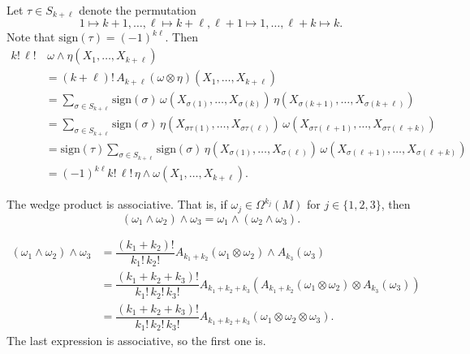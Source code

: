 \documentclass{ximera}
\begin{document}
    \begin{solution}
    Let $\tau \in S_{k + \ell }$ denote the permutation 
    \[   1 \mapsto  k  + 1 , \ldots , \ell \mapsto k + \ell , \ell + 1 \mapsto 1 , \ldots ,  \ell + k \mapsto k .                         \]
    Note that $\text{sign}(\tau) = (-1)^{k \ell}$. Then 
    \begin{align*}
        k! \, \ell ! &  \, \omega  \wedge \eta  (X_1,  \ldots  , X_{k + \ell})  \\
        & = ( k + \ell ) !\, A_{k + \ell} (\omega \otimes \eta ) (X_1, \ldots , X_{k + \ell })\\
        & = \sum _{\sigma \in S_{k + \ell}} \text{sign}(\sigma)\, \omega (  X_{\sigma (1) }  , \ldots , X_{\sigma (k)})\,  \eta (  X_{\sigma (k+1)} , \ldots , X_{\sigma (k + \ell )})\\
        & = \sum _{\sigma \in S_{k + \ell}} \text{sign}(\sigma)\,   \eta (  X_{\sigma \tau (1 )} , \ldots , X_{\sigma \tau ( \ell )}) \, \omega (  X_{\sigma \tau  (\ell + 1) }  , \ldots , X_{\sigma \tau  (\ell + k)}) \\
        & = \text{sign}(\tau) \sum _{\sigma \in S_{k + \ell}} \text{sign}(\sigma)\,   \eta (  X_{\sigma  (1 )} , \ldots , X_{\sigma  ( \ell )}) \, \omega (  X_{\sigma  (\ell + 1) }  , \ldots , X_{\sigma   (\ell + k)}) \\
       & = (-1)^{k \ell}  k! \, \ell ! \, \eta \wedge \omega (X_1, \ldots , X_{k + \ell}).
    \end{align*}

    \end{solution}



\begin{proposition}[Associativity]
    The wedge product is associative. That is, if $\omega _j \in \Omega ^{k_j} (M)$ for $j \in \{ 1, 2, 3 \}$, then 
    \[     (\omega_1 \wedge \omega _2)  \wedge \omega _3 = \omega _1 \wedge (\omega _2 \wedge \omega _3).                      \]
\end{proposition}


\begin{solution} 
    \begin{align*}
           (\omega_1 \wedge \omega _2)  \wedge \omega _3 & = \dfrac{(k_1 + k_2)!}{k_1!\,k_2!} A_{k_1 + k_2} (\omega_1 \otimes \omega_2) \wedge A_{k_3} ( \omega_3 )  \\
           & = \dfrac{(k_1 + k_2 + k_3 )!}{k_1!\,k_2!\, k_3!} A_{k_1 + k_2 + k _3} ( A_{k_1 + k_2} (\omega_1 \otimes \omega_2) \otimes A_{k_3} ( \omega_3 )  )\\
           & = \dfrac{(k_1 + k_2 + k_3 )!}{k_1!\,k_2!\, k_3!} A_{k_1 + k_2 + k _3} ( \omega_1 \otimes \omega_2  \otimes  \omega_3  ).
    \end{align*}
    The last expression is associative, so the first one is. 
\end{solution}
\end{document}
